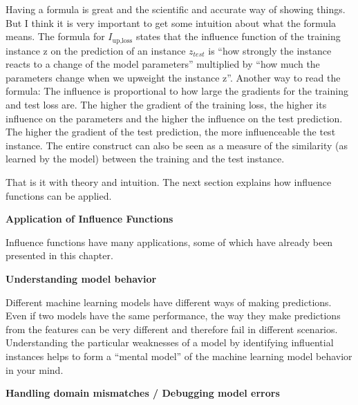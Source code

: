 \documentclass[
  12pt,
]{krantz}
\begin{document}
Having a formula is great and the scientific and accurate way of showing things.
But I think it is very important to get some intuition about what the formula means.
The formula for \(I_{\text{up,loss}}\) states that the influence function of the training instance z on the prediction of an instance \(z_{test}\) is ``how strongly the instance reacts to a change of the model parameters'' multiplied by ``how much the parameters change when we upweight the instance z''.
Another way to read the formula:
The influence is proportional to how large the gradients for the training and test loss are.
The higher the gradient of the training loss, the higher its influence on the parameters and the higher the influence on the test prediction.
The higher the gradient of the test prediction, the more influenceable the test instance.
The entire construct can also be seen as a measure of the similarity (as learned by the model) between the training and the test instance.

That is it with theory and intuition.
The next section explains how influence functions can be applied.

\textbf{Application of Influence Functions}

Influence functions have many applications, some of which have already been presented in this chapter.

\textbf{Understanding model behavior}

Different machine learning models have different ways of making predictions.
Even if two models have the same performance, the way they make predictions from the features can be very different and therefore fail in different scenarios.
Understanding the particular weaknesses of a model by identifying influential instances helps to form a ``mental model'' of the machine learning model behavior in your mind.

\textbf{Handling domain mismatches / Debugging model errors}
\end{document}

